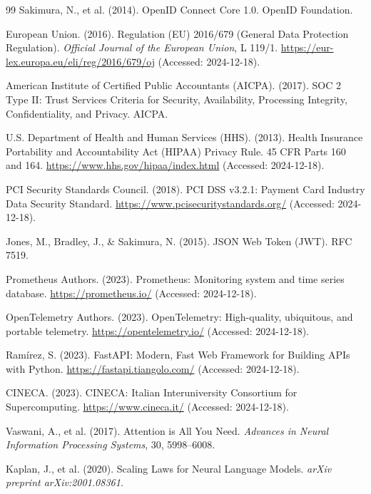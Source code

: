 \documentclass[a4paper,twoside]{sapthesis}
\begin{document}
\begin{thebibliography}{99}
Sakimura, N., et al. (2014). OpenID Connect Core 1.0. OpenID Foundation.

European Union. (2016). Regulation (EU) 2016/679 (General Data Protection Regulation). \textit{Official Journal of the European Union}, L 119/1. \url{https://eur-lex.europa.eu/eli/reg/2016/679/oj} (Accessed: 2024-12-18).

American Institute of Certified Public Accountants (AICPA). (2017). SOC 2 Type II: Trust Services Criteria for Security, Availability, Processing Integrity, Confidentiality, and Privacy. AICPA.

U.S. Department of Health and Human Services (HHS). (2013). Health Insurance Portability and Accountability Act (HIPAA) Privacy Rule. 45 CFR Parts 160 and 164. \url{https://www.hhs.gov/hipaa/index.html} (Accessed: 2024-12-18).

PCI Security Standards Council. (2018). PCI DSS v3.2.1: Payment Card Industry Data Security Standard. \url{https://www.pcisecuritystandards.org/} (Accessed: 2024-12-18).

Jones, M., Bradley, J., \& Sakimura, N. (2015). JSON Web Token (JWT). RFC 7519.

Prometheus Authors. (2023). Prometheus: Monitoring system and time series database. \url{https://prometheus.io/} (Accessed: 2024-12-18).

OpenTelemetry Authors. (2023). OpenTelemetry: High-quality, ubiquitous, and portable telemetry. \url{https://opentelemetry.io/} (Accessed: 2024-12-18).

Ram{\'i}rez, S. (2023). FastAPI: Modern, Fast Web Framework for Building APIs with Python. \url{https://fastapi.tiangolo.com/} (Accessed: 2024-12-18).

CINECA. (2023). CINECA: Italian Interuniversity Consortium for Supercomputing. \url{https://www.cineca.it/} (Accessed: 2024-12-18).

Vaswani, A., et al. (2017). Attention is All You Need. \textit{Advances in Neural Information Processing Systems}, 30, 5998--6008.

Kaplan, J., et al. (2020). Scaling Laws for Neural Language Models. \textit{arXiv preprint arXiv:2001.08361}.


\end{thebibliography}
\end{document}
